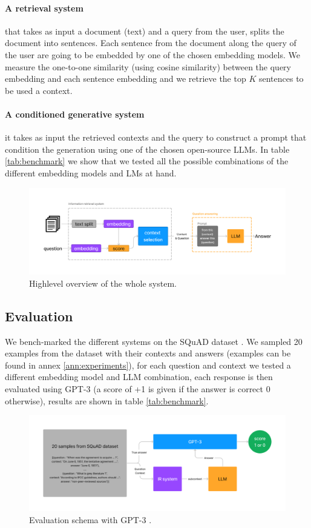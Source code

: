 \documentclass[a4paper,12pt]{article}
\begin{document}
\paragraph{A retrieval system} that takes as input a document (text) and a query from the user, splits the document into sentences. 
Each sentence from the document along the query of the user are going to be embedded by one of the chosen embedding models. We measure the one-to-one similarity (using cosine similarity) 
between the query embedding and each sentence embedding and we retrieve the top $K$ sentences to be used a context.

\paragraph{A conditioned generative system} it takes as input the retrieved contexts and the query to construct a prompt that condition the generation using one of the chosen open-source LLMs.
In table \ref{tab:benchmark} we show that we tested all the possible combinations of the different embedding models and LMs at hand.

\begin{figure}[htbp]
	\centering
	\includegraphics[width=.9\linewidth]{figures/full.png}
	\caption{Highlevel overview of the whole system.}
	\label{fig:overview}
\end{figure}

\subsection{Evaluation}
We bench-marked the different systems on the SQuAD dataset \cite{squad}. We sampled 20 examples from the dataset with their contexts and answers (examples can be found in annex \ref*{ann:experiments}), for each question and context 
we tested a different embedding model and LLM combination, each response is then evaluated using GPT-3 \cite{gpt3} (a score of +1 is given if the answer is correct 0 otherwise), results are shown in table \ref{tab:benchmark}.

\begin{figure}[htbp]
	\centering
	\includegraphics[width=.9\linewidth]{figures/evaluation.png}
	\caption{Evaluation schema with GPT-3 \cite{gpt3}.}
	\label{fig:evaluation}
\end{figure}
\end{document}
